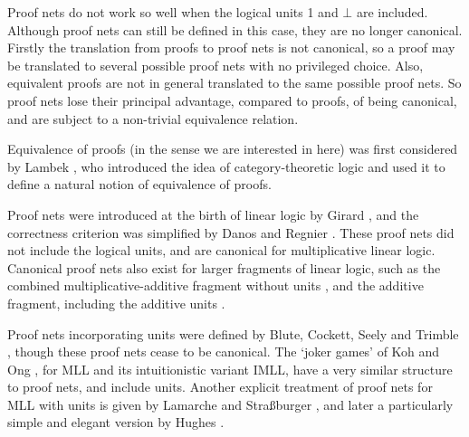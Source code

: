 \documentclass{lmcs}
\let\capsabbrev=\uppercase
\begin{document}
Proof nets do not work so well when the logical units 1 and $\bot$ are included. Although
proof nets can still be defined in this case, they are no longer canonical. Firstly the
translation from proofs to proof nets is not canonical, so a proof may be translated
to several possible proof nets with no privileged choice. Also, equivalent proofs are not
in general translated to the same possible proof nets. So proof nets lose their principal
advantage, compared to proofs, of being canonical, and are subject to a non-trivial
equivalence relation.

Equivalence of proofs (in the sense we are interested in here) was first considered
by Lambek \cite{Lambek-1968}, who introduced the idea of category-theoretic logic and used
it to define a natural notion of equivalence of proofs.

Proof nets were introduced at the birth of linear logic by Girard \cite{Girard-1987}, and
the correctness criterion was simplified by Danos and Regnier \cite{Danos-Regnier-1989}.
These proof nets did not include the logical units, and are canonical for multiplicative linear logic.
%
Canonical proof nets also exist for larger fragments of linear logic, such as the combined multiplicative-additive fragment without units \cite{Hughes-vanGlabbeek-2005}, and the additive fragment, including the additive units \cite{Heijltjes-2011}.

Proof nets incorporating units were defined by Blute, Cockett, Seely and Trimble \cite{Trimble-1994,Blute-Cockett-Seely-Trimble-1996}, though these proof nets cease to be canonical. The `joker games' of Koh and Ong \cite{Koh-Ong-1999}, for MLL and its intuitionistic variant IMLL, have a very similar structure to proof nets, and include units. Another explicit treatment of proof nets for \capsabbrev{mll} with units is given by Lamarche and Stra\ss burger \cite{Lamarche-Strassburger-2006}, and later a particularly simple and elegant version by Hughes \cite{Hughes-2012-categories,Hughes-2012-nets}.

\end{document}
